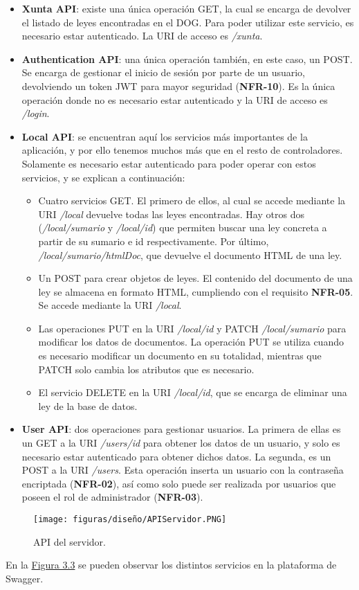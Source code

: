 \begin{itemize}
    \item {\bf Xunta API}: existe una única operación GET, la cual se encarga de devolver el listado de leyes encontradas en el DOG. Para poder utilizar este servicio, es necesario estar autenticado. La URI de acceso es {\it /xunta}.
    \item {\bf Authentication API}: una única operación también, en este caso, un POST. Se encarga de gestionar el inicio de sesión por parte de un usuario, devolviendo un token JWT \cite{jwt} para mayor seguridad ({\bf NFR-10}). Es la única operación donde no es necesario estar autenticado y la URI de acceso es {\it /login}.
    \item {\bf Local API}: se encuentran aquí los servicios más importantes de la aplicación, y por ello tenemos muchos más que en el resto de controladores. Solamente es necesario estar autenticado para poder operar con estos servicios, y se explican a continuación:
        \begin{itemize}
            \item Cuatro servicios GET. El primero de ellos, al cual se accede mediante la URI {\it /local} devuelve todas las leyes encontradas. Hay otros dos ({\it /local/sumario} y {\it /local/{id}}) que permiten buscar una ley concreta a partir de su sumario e id respectivamente. Por último, {\it /local/{sumario}/htmlDoc}, que devuelve el documento HTML de una ley.
            \item Un POST para crear objetos de leyes. El contenido del documento de una ley se almacena en formato HTML, cumpliendo con el requisito {\bf NFR-05}. Se accede mediante la URI {\it /local}.
            \item Las operaciones PUT en la URI {\it /local/{id}} y PATCH {\it /local/{sumario}} para modificar los datos de documentos. La operación PUT se utiliza cuando es necesario modificar un documento en su totalidad, mientras que PATCH solo cambia los atributos que es necesario.
            \item El servicio DELETE en la URI {\it /local/{id}}, que se encarga de eliminar una ley de la base de datos.
        \end{itemize}
    \item {\bf User API}: dos operaciones para gestionar usuarios. La primera de ellas es un GET a la URI {\it /users/{id}} para obtener los datos de un usuario, y solo es necesario estar autenticado para obtener dichos datos. La segunda, es un POST a la URI {\it /users}. Esta operación inserta un usuario con la contraseña encriptada ({\bf NFR-02}), así como solo puede ser realizada por usuarios que poseen el rol de administrador ({\bf NFR-03}).
\end{itemize}

\begin{figure}[H]
\centerline{\texttt{[image: figuras/diseño/APIServidor.PNG]}}
\caption{API del servidor.}
\label{enlaceAPIServidor}
\end{figure}

En la \hyperref[enlaceAPIServidor]{Figura 3.3} se pueden observar los distintos servicios en la plataforma de Swagger.
